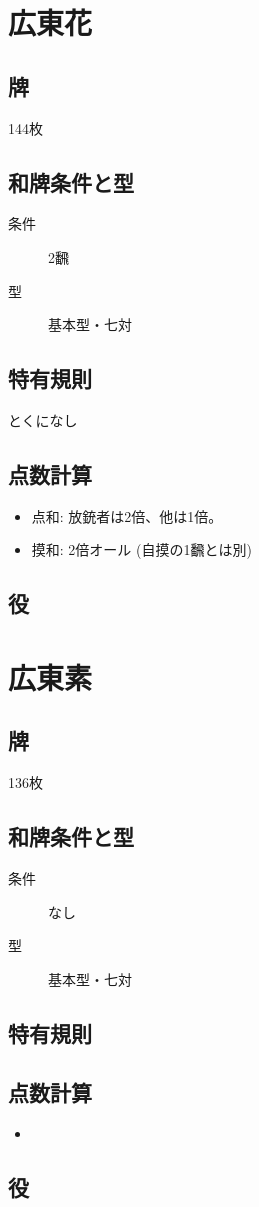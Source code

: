 \documentclass{ltjsarticle}
\begin{document}
\section{広東花}
\subsection{牌}144枚
\subsection{和牌条件と型}
\begin{description}
    \item[条件] 2飜
    \item[型] 基本型・七対
\end{description}
\subsection{特有規則}
とくになし
\subsection{点数計算}
\begin{itemize}
    \item 点和: 放銃者は2倍、他は1倍。
    \item 摸和: 2倍オール (自摸の1飜とは別)
\end{itemize}
\subsection{役}
\begin{description}
    \item[]
\end{description}
\section{広東素}
\subsection{牌}136枚
\subsection{和牌条件と型}
\begin{description}
    \item[条件] なし
    \item[型] 基本型・七対
\end{description}
\subsection{特有規則}
\begin{description}
    \item[]
\end{description}
\subsection{点数計算}
\begin{itemize}
    \item
\end{itemize}
\subsection{役}
\begin{description}
    \item[]
\end{description}
\end{document}
